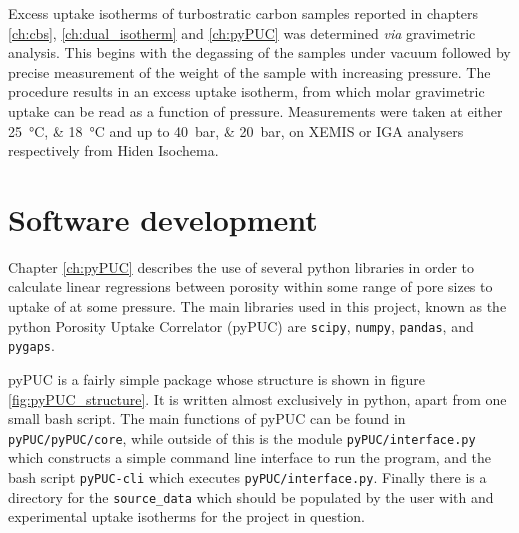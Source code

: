 Excess  uptake isotherms of \gls{turbostratic carbon} samples reported in chapters \ref{ch:cbs}, \ref{ch:dual_isotherm} and \ref{ch:pyPUC} was determined \textit{via} gravimetric analysis. This begins with the degassing of the samples under vacuum followed by precise measurement of the weight of the sample with increasing  pressure. The procedure results in an excess  uptake isotherm, from which molar gravimetric uptake can be read as a function of pressure. Measurements were taken at either \qtylist[list-pair-separator={ or }, list-units=single]{25;18}{\degreeCelsius} and up to \qtylist[list-pair-separator={ or }, list-units=single]{40;20}{\bar}, on XEMIS or IGA analysers respectively from Hiden Isochema. 

\section{Software development}
Chapter \ref{ch:pyPUC} describes the use of several python libraries in order to calculate linear regressions between porosity within some range of pore sizes to uptake of  at some pressure. The main libraries used in this project, known as the python Porosity Uptake Correlator (pyPUC) are \verb|scipy|,\citep{SciPy2020} \verb|numpy|,\citep{numpy2022} \verb|pandas|,\citep{pandas2010} and \verb|pygaps|.\citep{Iacomi2019pyGAPS}

pyPUC is a fairly simple package whose structure is shown in figure \ref{fig:pyPUC_structure}. It is written almost exclusively in python,\citep{python1995} apart from one small bash script.\citep{bash2007} The main functions of pyPUC can be found in \verb|pyPUC/pyPUC/core|, while outside of this is the module \verb|pyPUC/interface.py| which constructs a simple command line interface to run the program, and the bash script \verb|pyPUC-cli| which executes \verb|pyPUC/interface.py|. Finally there is a directory for the \verb|source_data| which should be populated by the user with  and experimental uptake isotherms for the project in question.

